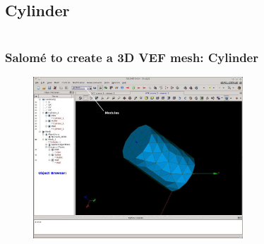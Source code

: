 \documentclass[10pt, hyperref={unicode=true,pdfusetitle, bookmarks=true,bookmarksnumbered=false,bookmarksopen=false, breaklinks=false,pdfborder={0 0 1},backref=true,colorlinks=true,linkcolor=darkblue,pageanchor}]{beamer}
\begin{document}
\subsection{Cylinder}
\begin{frame}
\begin{small}
\begin{columns}[c] 
\tableofcontents[sections={1-9},currentsection, currentsubsection]
\tableofcontents[sections={10-16},currentsection, currentsubsection]
\end{columns}
\end{small}
\end{frame}
\begin{frame}
\frametitle{Salom\'e to create a 3D VEF mesh: Cylinder}

\begin{figure}
\includegraphics[width=0.7\textwidth]{PICTURES/salome1_2.jpg}
\end{figure}

\end{frame}
\end{document}
